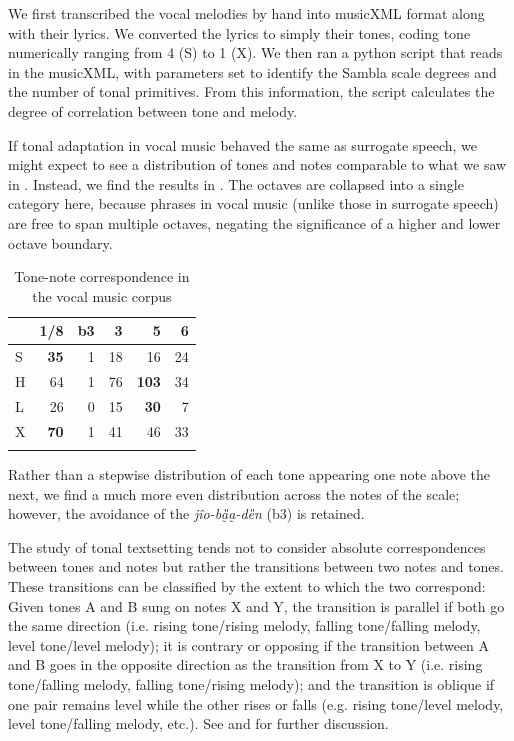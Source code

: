 \documentclass[output=paper]{langscibook}
\begin{document}
We first transcribed the vocal melodies by hand into musicXML format along with their lyrics. We converted the lyrics to simply their tones, coding tone numerically ranging from 4 (S) to 1 (X). We then ran a python script that reads in the musicXML, with parameters set to identify the Sambla scale degrees and the number of tonal primitives. From this information, the script calculates the degree of correlation between tone and melody. 

If tonal adaptation in vocal music behaved the same as surrogate speech, we might expect to see a distribution of tones and notes comparable to what we saw in . Instead, we find the results in . The octaves are collapsed into a single category here, because phrases in vocal music (unlike those in surrogate speech) are free to span multiple octaves, negating the significance of a higher and lower octave boundary. 

\begin{table}
 \caption{Tone-note correspondence in the vocal music corpus\label{tab:mcpherson:tonenote2}} 
\begin{tabular}{lrrrrr}
\lsptoprule
   & {1/8} & {b3} & {3} & {5} & {6} \\ \midrule
   S & \textbf{35} & 1 & 18 & 16 & 24 \\ 
   H & 64 & 1 & 76 & \textbf{103} & 34  \\ 
   L & 26 & 0 & 15 & \textbf{30} & 7  \\ 
   X & \textbf{70} & 1 & 41 & 46 & 33  \\ \lspbottomrule
\end{tabular}
\end{table}

Rather than a stepwise distribution of each tone appearing one note above the next, we find a much more even distribution across the notes of the scale; however, the avoidance of the \textit{jîo-bȁ̰a̰-dȅn} (b3) is retained.

The study of tonal textsetting tends not to consider absolute correspondences between tones and notes but rather the transitions between two notes and tones. These transitions can be classified by the extent to which the two correspond: Given tones A and B sung on notes X and Y, the transition is parallel if both go the same direction (i.e. rising tone/rising melody, falling tone/falling melody, level tone/level melody); it is contrary or opposing if the transition between A and B goes in the opposite direction as the transition from X to Y (i.e. rising tone/falling melody, falling tone/rising melody); and the transition is oblique if one pair remains level while the other rises or falls (e.g. rising tone/level melody, level tone/falling melody, etc.). See \citet{Schellenberg2012} and \citet{LaddKirby2020} for further discussion.
\end{document}

